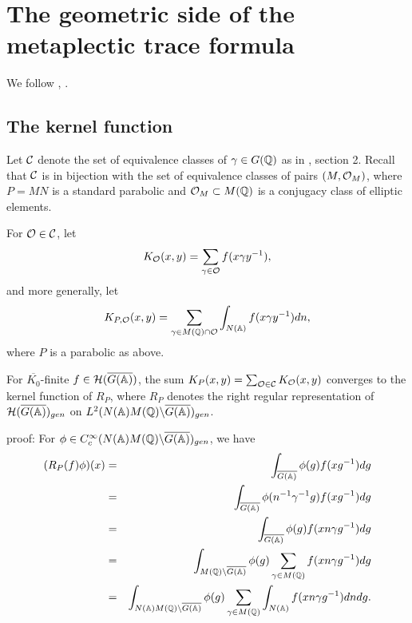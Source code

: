 \section{The geometric side of the metaplectic trace formula}

We follow \cite{A2}, \cite{A3}.

\subsection{The kernel function}

Let ${\cal{C}}$ denote the set of equivalence classes of
$\gamma \in G({\Bbb{Q}})$ as in \cite{A2}, section 2.
Recall that ${\cal{C}}$ is in bijection
with the set of equivalence classes of pairs $(M,{\cal{O}}_M)$,
where $P=MN $ is a standard parabolic and
${\cal{O}}_M\subset M({\Bbb{Q}})$ is a
conjugacy class of elliptic elements.

For ${\cal{O}}\in {\cal{C}}$, let 
\[
K_{{\cal{O}}}(x,y)=\sum_{\gamma \in {\cal{O}}}f(x\gamma y^{-1}),
\]
and more generally, let 
\begin{equation}
K_{P,{\cal{O}}}(x,y)=\sum_{\gamma \in M({\Bbb{Q}})\cap {\cal{O}}}
\int_{N({\Bbb{A}})}f(x\gamma y^{-1})dn,
\end{equation}
where $P$ is a parabolic as above.

\begin{lemma}
For $\overline{K_0}$-finite
$f\in {\cal{H}}(\overline{G({\Bbb{A}})})$, the sum
$K_P(x,y)=\sum_{{\cal{O}}\in {\cal{C}}}K_{{\cal{O}}}(x,y)$
converges to the kernel
function of $R_P$, where $R_P$ denotes the right
regular representation of
${\cal{H}}(\overline{G({\Bbb{A}})})_{gen}$ on
$L^2(N({\Bbb{A}})M({\Bbb{Q}})\backslash \overline{G({\Bbb{A}})})_{gen}$.
\end{lemma}

proof: For
$\phi \in C_c^\infty (N({\Bbb{A}})M({\Bbb{Q}})
\backslash \overline{G({\Bbb{A}})})_{gen}$, we have 
\begin{eqnarray*}
(R_P(f)\phi )(x) &=&\int_{\overline{G({\Bbb{A}})}}\phi (g)f(xg^{-1})dg \\
&=&\int_{\overline{G({\Bbb{A}})}}\phi (n^{-1}\gamma ^{-1}g)f(xg^{-1})dg \\
&=&\int_{\overline{G({\Bbb{A}})}}\phi (g)f(xn\gamma g^{-1})dg \\
&=&\int_{M({\Bbb{Q}})\backslash \overline{G({\Bbb{A}})}}\phi (g)\sum_{\gamma \in
M({\Bbb{Q}})}f(xn\gamma g^{-1})dg \\
&=&\int_{N({\Bbb{A}})M({\Bbb{Q}})\backslash \overline{G({\Bbb{A}})}}\phi
(g)\sum_{\gamma \in M({\Bbb{Q}})}\int_{N({\Bbb{A}})}f(xn\gamma g^{-1})dndg.
\end{eqnarray*}

